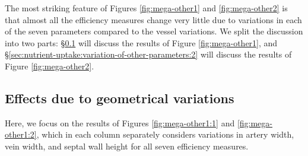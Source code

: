         The most striking feature of Figures \ref{fig:mega-other1} and \ref{fig:mega-other2} is that almost all the efficiency measures change very little due to variations in each of the seven parameters compared to the vessel variations. We split the discussion into two parts: \S\ref{sec:nutrient-uptake:variation-of-other-parameters:1} will discuss the results of Figure \ref{fig:mega-other1}, and \S\ref{sec:nutrient-uptake:variation-of-other-parameters:2} will discuss the results of Figure \ref{fig:mega-other2}.

        \subsection{Effects due to geometrical variations} \label{sec:nutrient-uptake:variation-of-other-parameters:1}
            Here, we focus on the results of Figures \ref{fig:mega-other1:1} and \ref{fig:mega-other1:2}, which in each column separately considers variations in artery width, vein width, and septal wall height for all seven efficiency measures.

